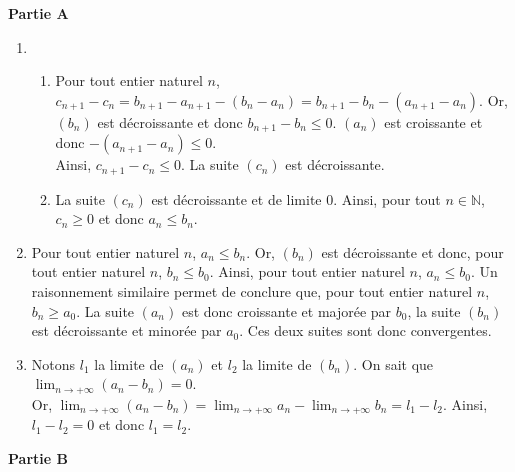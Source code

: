 \documentclass[11pt,fleqn, openany]{book} %
\begin{document}
\begin{solution}
\textbf{Partie A}

\begin{enumerate}
\item \begin{enumerate}
\item Pour tout entier naturel $n$, $c_{n+1}-c_n = b_{n+1}-a_{n+1}-(b_n-a_n)=b_{n+1}-b_n-(a_{n+1}-a_n)$.
Or, $(b_n)$ est décroissante et donc $b_{n+1}-b_n \leqslant 0$. $(a_n)$ est croissante et donc $-(a_{n+1}-a_n) \leqslant 0$. \\Ainsi, $c_{n+1}-c_n \leqslant 0$. La suite $(c_n)$ est décroissante.
\item La suite $(c_n)$ est décroissante et de limite 0. Ainsi, pour tout $n\in \mathbb{N}$, $c_n \geqslant 0$ et donc $a_n \leqslant b_n$.
\end{enumerate}
\item Pour tout entier naturel $n$, $a_n \leqslant b_n$. Or, $(b_n)$ est décroissante et donc, pour tout entier naturel $n$, $b_n \leqslant b_0$. Ainsi, pour tout entier naturel $n$, $a_n \leqslant b_0$. Un raisonnement similaire permet de conclure que, pour tout entier naturel $n$, $b_n \geqslant a_0$. La suite $(a_n)$ est donc croissante et majorée par $b_0$, la suite $(b_n)$ est décroissante et minorée par $a_0$. Ces deux suites sont donc convergentes.
\item Notons $l_1$ la limite de $(a_n)$ et $l_2$ la limite de $(b_n)$. On sait que $\displaystyle\lim_{n \to + \infty}(a_n-b_n)=0$. \\
Or, $\displaystyle\lim_{n \to + \infty}(a_n-b_n)=\displaystyle\lim_{n \to + \infty}a_n-\displaystyle\lim_{n \to + \infty}b_n=l_1-l_2$. Ainsi, $l_1-l_2=0$ et donc $l_1=l_2$.
\end{enumerate}

\textbf{Partie B}



\end{solution}
\end{document}
